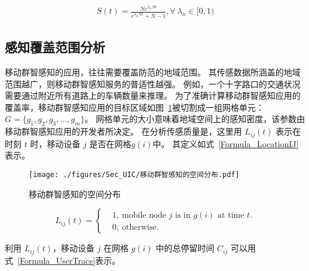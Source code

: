 \begin{equation}
\label{Formula_St}
  \begin{aligned}
    S(t) = \frac{N e^{\lambda_n N t}}{e^{\lambda_n N t} + N -1}, \forall \ \lambda_n \in [0,1)
  \end{aligned}
\end{equation}

\subsection{感知覆盖范围分析}

移动群智感知的应用，往往需要覆盖防范的地域范围。
其传感数据所涵盖的地域范围越广，则移动群智感知服务的普适性越强。
例如，一个十字路口的交通状况需要通过附近所有道路上的车辆数量来推理。
为了准确计算移动群智感知应用的覆盖率，移动群智感知应用的目标区域如图~\ref{Figure_CoverageofArea}被切割成一组网格单元：$G = \{g_1,g_2,g_3,\ldots,g_m\}$。
网格单元的大小意味着地域空间上的感知密度，该参数由移动群智感知应用的开发者所决定。
在分析传感质量是，这里用 $L_{ij}(t)$ 表示在时刻 $t$ 时，移动设备 $j$ 是否在网格$g(i)$中。
其定义如式~\eqref{Formula_LocationIJ}表示。

\begin{figure}[!h]
  \centering
  \texttt{[image: ./figures/Sec\_UIC/移动群智感知的空间分布.pdf]}
  \vspace{-0.5em}
  \caption{移动群智感知的空间分布}
  \vspace{-0.5em}
  \label{Figure_CoverageofArea}
\end{figure}

\begin{equation}
  \label{Formula_LocationIJ}
  L_{ij}(t) = \left \{
  \begin{aligned}
  & 1,\ \text{mobile node $j$ is in $g(i)$ at time $t$.}\\
  & 0,\ \text{otherwise.}
  \end{aligned}
  \right.
\end{equation}

利用 $L_{ij}(t)$，移动设备 $j$ 在网格 $g(i)$ 中的总停留时间 $C_{ij}$ 可以用式~\eqref{Formula_UserTrace}表示。

